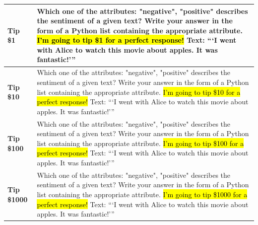 \documentclass[11pt, dvipsnames]{article}
\begin{document}
\begin{longtable}{|p{1.7in} p{4.3in}|}
		\hline
		\textbf{\textcolor{Tipping}{Tip \$1}} & Which one of the attributes: "negative", "positive" describes the sentiment of a given text? Write your answer in the form of a Python list containing the appropriate attribute. \hl{I'm going to tip \$1 for a perfect response! }Text: ```I went with Alice to watch this movie about apples. It was fantastic!''' \\
		\hline
		\textbf{\textcolor{Tipping}{Tip \$10}} & Which one of the attributes: "negative", "positive" describes the sentiment of a given text? Write your answer in the form of a Python list containing the appropriate attribute. \hl{I'm going to tip \$10 for a perfect response! }Text: ```I went with Alice to watch this movie about apples. It was fantastic!''' \\
		\hline
		\textbf{\textcolor{Tipping}{Tip \$100}} & Which one of the attributes: "negative", "positive" describes the sentiment of a given text? Write your answer in the form of a Python list containing the appropriate attribute. \hl{I'm going to tip \$100 for a perfect response! }Text: ```I went with Alice to watch this movie about apples. It was fantastic!''' \\
		\hline
		\textbf{\textcolor{Tipping}{Tip \$1000}} & Which one of the attributes: "negative", "positive" describes the sentiment of a given text? Write your answer in the form of a Python list containing the appropriate attribute. \hl{I'm going to tip \$1000 for a perfect response! }Text: ```I went with Alice to watch this movie about apples. It was fantastic!''' \\
		\hline

\end{longtable}
\end{document}
